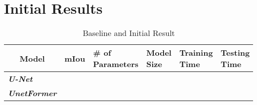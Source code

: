 \FloatBarrier

\section{Initial Results}

\begin{table}[]
\begin{tabular}{|l|l|l|l|l|l|}
\hline
\multicolumn{1}{|c|}{\textbf{Model}} & \multicolumn{1}{c|}{\textbf{mIou}} & \textbf{\# of Parameters} & \textbf{Model Size} & \textbf{Training Time} & \textbf{Testing Time} \\ \hline
\textit{\textbf{U-Net}}              &                                    &                                    &                     &                        &                       \\ \hline
\textit{\textbf{UnetFormer}}         &                                    &                                    &                     &                        &                       \\ \hline
\end{tabular}
\caption{Baseline and Initial Result}
\label{tab:result}

\end{table}

